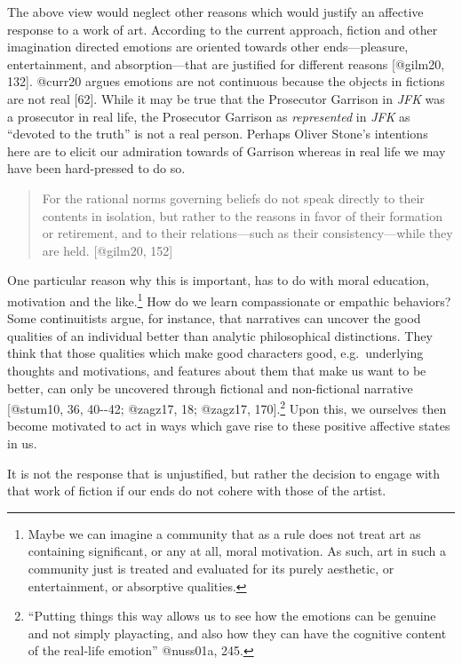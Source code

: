 \documentclass[
  letterpaper,
  DIV=11,
  numbers=noendperiod]{scrartcl}
\theoremstyle{remark}
\begin{document}
The above view would neglect other reasons which would justify an
affective response to a work of art. According to the current approach,
fiction and other imagination directed emotions are oriented towards
other ends---pleasure, entertainment, and absorption---that are
justified for different reasons {[}@gilm20, 132{]}. @curr20 argues
emotions are not continuous because the objects in fictions are not real
{[}62{]}. While it may be true that the Prosecutor Garrison in
\emph{JFK} was a prosecutor in real life, the Prosecutor Garrison as
\emph{represented} in \emph{JFK} as ``devoted to the truth'' is not a
real person. Perhaps Oliver Stone's intentions here are to elicit our
admiration towards of Garrison whereas in real life we may have been
hard-pressed to do so.

\begin{quote}
For the rational norms governing beliefs do not speak directly to their
contents in isolation, but rather to the reasons in favor of their
formation or retirement, and to their relations---such as their
consistency---while they are held. {[}@gilm20, 152{]}
\end{quote}

One particular reason why this is important, has to do with moral
education, motivation and the like.\footnote{Maybe we can imagine a
  community that as a rule does not treat art as containing significant,
  or any at all, moral motivation. As such, art in such a community just
  is treated and evaluated for its purely aesthetic, or entertainment,
  or absorptive qualities.} How do we learn compassionate or empathic
behaviors? Some continuitists argue, for instance, that narratives can
uncover the good qualities of an individual better than analytic
philosophical distinctions. They think that those qualities which make
good characters good, e.g.~underlying thoughts and motivations, and
features about them that make us want to be better, can only be
uncovered through fictional and non-fictional narrative {[}@stum10, 36,
40-\/-42; @zagz17, 18; @zagz17, 170{]}.\footnote{``Putting things this
  way allows us to see how the emotions can be genuine and not simply
  playacting, and also how they can have the cognitive content of the
  real-life emotion'' @nuss01a, 245.} Upon this, we ourselves then
become motivated to act in ways which gave rise to these positive
affective states in us.

It is not the response that is unjustified, but rather the decision to
engage with that work of fiction if our ends do not cohere with those of
the artist.
\end{document}
